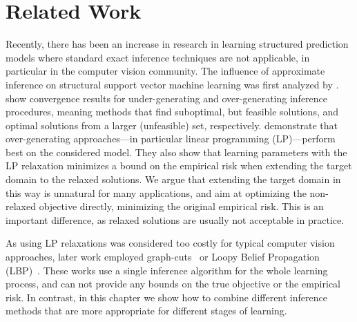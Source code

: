 \section{Related Work}



Recently, there has been an increase in research in learning structured
prediction models where standard exact inference techniques are not applicable,
in particular in the computer vision community.
The influence of approximate inference on structural support vector machine
learning was first analyzed by  \citet{finley2008training}.
\citet{finley2008training} show convergence results for under-generating and
over-generating inference procedures, meaning methods that find suboptimal, but
feasible solutions, and optimal solutions from a larger (unfeasible) set,
respectively.
\citet{finley2008training} demonstrate that over-generating approaches---in
particular linear programming (LP)---perform best on the considered model.
They also show that learning parameters with the LP relaxation minimizes a
bound on the empirical risk when extending the target domain to the relaxed
solutions.
We argue that extending the target domain in this way is unnatural for many applications,
and aim at optimizing the non-relaxed objective directly, minimizing
the original empirical risk. This is an important difference, as relaxed solutions
are usually not acceptable in practice.

As using LP relaxations was considered too costly for typical computer vision
approaches, later work employed graph-cuts~\citep{szummer2008learning} or Loopy
Belief Propagation (LBP)~\citep{lucchi2011spatial}. These works use a single
inference algorithm for the whole learning process, and can not provide any
bounds on the true objective or the empirical risk. In contrast, in this chapter
we show how to combine different inference methods that are more appropriate
for different stages of learning.


